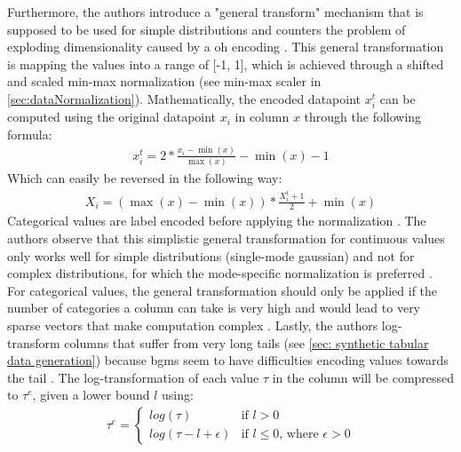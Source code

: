 Furthermore, the authors introduce a "general transform" mechanism \cite[p. 7]{zhao2022CTABGANEnhancingTabular} that is supposed to be used for simple distributions and counters the problem of exploding dimensionality caused by a \gls{oh} encoding \cite{zhao2022CTABGANEnhancingTabular}.
This general transformation is mapping the values into a range of [-1, 1], which is achieved through a shifted and scaled min-max normalization (see min-max scaler in \autoref{sec:dataNormalization}).
Mathematically, the encoded datapoint $x^t_i$ can be computed using the original datapoint $x_i$ in column $x$ through the following formula:
\begin{equation}
	\begin{align*}
		x^t_i=2* \frac{x_i-\min(x)}{\max(x)}-\min(x)-1
	\end{align*}
\end{equation}
Which can easily be reversed in the following way:
\begin{equation}
	\begin{align*}
		X_i = (\max(x)-\min(x))*\frac{X^t_i+1}{2}+\min(x)
	\end{align*}
\end{equation}
Categorical values are label encoded before applying the normalization \cite{zhao2022CTABGANEnhancingTabular}.
The authors observe that this simplistic general transformation for continuous values only works well for simple distributions (\eg single-mode gaussian) and not for complex distributions, for which the mode-specific normalization is preferred \cite{zhao2022CTABGANEnhancingTabular}.
For categorical values, the general transformation should only be applied if the number of categories a column can take is very high and would lead to very sparse vectors that make computation complex \cite{zhao2022CTABGANEnhancingTabular}.
Lastly, the authors log-transform columns that suffer from very long tails (see \autoref{sec: synthetic tabular data generation}) because \Glspl{bgm} seem to have difficulties encoding values towards the tail \cite{zhao2022CTABGANEnhancingTabular}.
The log-transformation of each value $\tau$ in the column will be compressed to $\tau^e$, given a lower bound $l$ using:
\begin{equation}
	\label{eqn:log-transform}
	\begin{align*}
		\tau^e =
		\begin{cases}
			log(\tau)            & \text{if } l>0                                 \\
			log(\tau-l+\epsilon) & \text{if } l\leq0 \text{, where } \epsilon > 0
		\end{cases}
	\end{align*}
\end{equation}


